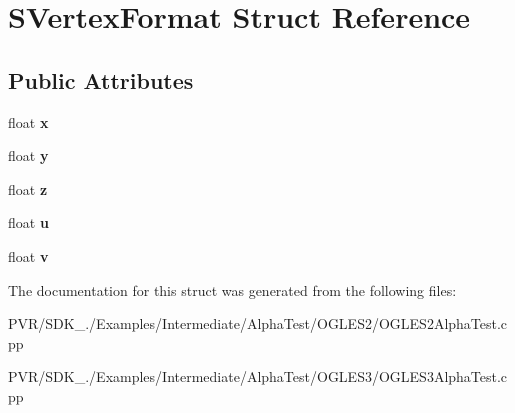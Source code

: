 \hypertarget{struct_s_vertex_format}{\section{S\+Vertex\+Format Struct Reference}
\label{struct_s_vertex_format}
}
\subsection*{Public Attributes}
\begin{DoxyCompactItemize}
\item 
\hypertarget{struct_s_vertex_format_a8400a37982a247c23a18e37cc3435d29}{float {\bfseries x}}\label{struct_s_vertex_format_a8400a37982a247c23a18e37cc3435d29}

\item 
\hypertarget{struct_s_vertex_format_a829dec1a860efa8c70f2eff2608ef0ae}{float {\bfseries y}}\label{struct_s_vertex_format_a829dec1a860efa8c70f2eff2608ef0ae}

\item 
\hypertarget{struct_s_vertex_format_a14146c2ca2a0deebbf83b9cc24ebbcf5}{float {\bfseries z}}\label{struct_s_vertex_format_a14146c2ca2a0deebbf83b9cc24ebbcf5}

\item 
\hypertarget{struct_s_vertex_format_a572407d244905da7c7ffcfb403ec18e9}{float {\bfseries u}}\label{struct_s_vertex_format_a572407d244905da7c7ffcfb403ec18e9}

\item 
\hypertarget{struct_s_vertex_format_a06dd5269dc402cdd56db4fe1f01c359b}{float {\bfseries v}}\label{struct_s_vertex_format_a06dd5269dc402cdd56db4fe1f01c359b}

\end{DoxyCompactItemize}


The documentation for this struct was generated from the following files\+:\begin{DoxyCompactItemize}
\item 
P\+V\+R/\+S\+D\+K\+\_./\+Examples/\+Intermediate/\+Alpha\+Test/\+O\+G\+L\+E\+S2/O\+G\+L\+E\+S2\+Alpha\+Test.\+cpp\item 
P\+V\+R/\+S\+D\+K\+\_./\+Examples/\+Intermediate/\+Alpha\+Test/\+O\+G\+L\+E\+S3/O\+G\+L\+E\+S3\+Alpha\+Test.\+cpp\end{DoxyCompactItemize}
